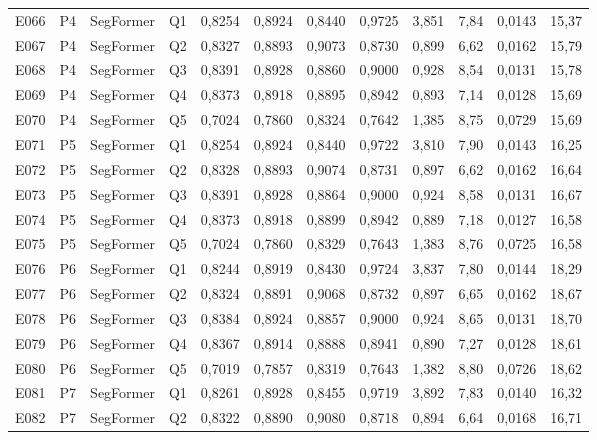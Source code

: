 \begin{longtable}{lllllccccccc}
E066 & P4 & SegFormer & Q1 & 0{,}8254 & 0{,}8924 & 0{,}8440 & 0{,}9725 & 3{,}851 & 7{,}84 & 0{,}0143 & 15{,}37 \\
E067 & P4 & SegFormer & Q2 & 0{,}8327 & 0{,}8893 & 0{,}9073 & 0{,}8730 & 0{,}899 & 6{,}62 & 0{,}0162 & 15{,}79 \\
E068 & P4 & SegFormer & Q3 & 0{,}8391 & 0{,}8928 & 0{,}8860 & 0{,}9000 & 0{,}928 & 8{,}54 & 0{,}0131 & 15{,}78 \\
E069 & P4 & SegFormer & Q4 & 0{,}8373 & 0{,}8918 & 0{,}8895 & 0{,}8942 & 0{,}893 & 7{,}14 & 0{,}0128 & 15{,}69 \\
E070 & P4 & SegFormer & Q5 & 0{,}7024 & 0{,}7860 & 0{,}8324 & 0{,}7642 & 1{,}385 & 8{,}75 & 0{,}0729 & 15{,}69 \\
E071 & P5 & SegFormer & Q1 & 0{,}8254 & 0{,}8924 & 0{,}8440 & 0{,}9722 & 3{,}810 & 7{,}90 & 0{,}0143 & 16{,}25 \\
E072 & P5 & SegFormer & Q2 & 0{,}8328 & 0{,}8893 & 0{,}9074 & 0{,}8731 & 0{,}897 & 6{,}62 & 0{,}0162 & 16{,}64 \\
E073 & P5 & SegFormer & Q3 & 0{,}8391 & 0{,}8928 & 0{,}8864 & 0{,}9000 & 0{,}924 & 8{,}58 & 0{,}0131 & 16{,}67 \\
E074 & P5 & SegFormer & Q4 & 0{,}8373 & 0{,}8918 & 0{,}8899 & 0{,}8942 & 0{,}889 & 7{,}18 & 0{,}0127 & 16{,}58 \\
E075 & P5 & SegFormer & Q5 & 0{,}7024 & 0{,}7860 & 0{,}8329 & 0{,}7643 & 1{,}383 & 8{,}76 & 0{,}0725 & 16{,}58 \\
E076 & P6 & SegFormer & Q1 & 0{,}8244 & 0{,}8919 & 0{,}8430 & 0{,}9724 & 3{,}837 & 7{,}80 & 0{,}0144 & 18{,}29 \\
E077 & P6 & SegFormer & Q2 & 0{,}8324 & 0{,}8891 & 0{,}9068 & 0{,}8732 & 0{,}897 & 6{,}65 & 0{,}0162 & 18{,}67 \\
E078 & P6 & SegFormer & Q3 & 0{,}8384 & 0{,}8924 & 0{,}8857 & 0{,}9000 & 0{,}924 & 8{,}65 & 0{,}0131 & 18{,}70 \\
E079 & P6 & SegFormer & Q4 & 0{,}8367 & 0{,}8914 & 0{,}8888 & 0{,}8941 & 0{,}890 & 7{,}27 & 0{,}0128 & 18{,}61 \\
E080 & P6 & SegFormer & Q5 & 0{,}7019 & 0{,}7857 & 0{,}8319 & 0{,}7643 & 1{,}382 & 8{,}80 & 0{,}0726 & 18{,}62 \\
E081 & P7 & SegFormer & Q1 & 0{,}8261 & 0{,}8928 & 0{,}8455 & 0{,}9719 & 3{,}892 & 7{,}83 & 0{,}0140 & 16{,}32 \\
E082 & P7 & SegFormer & Q2 & 0{,}8322 & 0{,}8890 & 0{,}9080 & 0{,}8718 & 0{,}894 & 6{,}64 & 0{,}0168 & 16{,}71 \\

\end{longtable}
